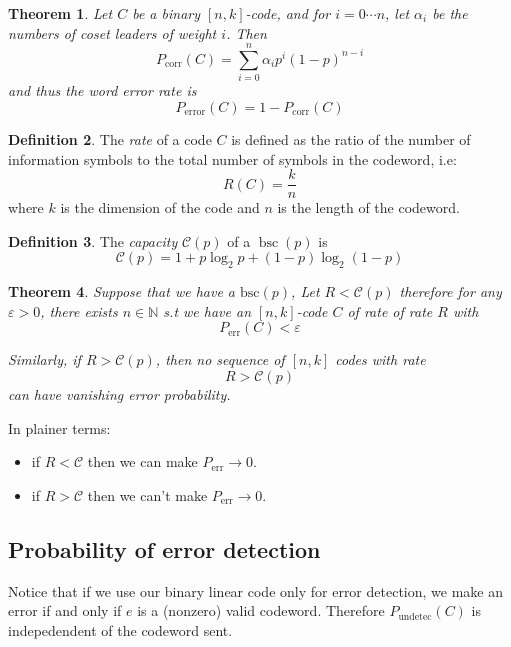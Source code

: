 \documentclass[11pt,a4paper]{article}
\theoremstyle{definition}
\newtheorem{definition}{Definition}[section]
\theoremstyle{plain}
\newtheorem{theorem}[definition]{Theorem}
\theoremstyle{remark}
\begin{document}
\begin{theorem}
    Let $C$ be a binary $[n,k]$-code, and for $i = 0 \cdots n$, let $\alpha_i$ be the numbers 
    of coset leaders of weight $i$. Then 
    $$P_{\text{corr}}(C) = \sum_{i = 0}^{n} \alpha_i p^i (1 - p)^{n-i}$$
    and thus the \emph{word error rate} is 
    $$P_{\text{error}}(C) = 1 - P_{\text{corr}}(C)$$
\end{theorem}

\begin{definition}
    The \emph{rate} of a code $C$ is defined as the ratio of the number of information symbols to the total number of symbols in the codeword, i.e: 
    $$R(C) = \frac{k}{n}$$
    where $k$ is the dimension of the code and $n$ is the length of the codeword.
\end{definition}

\begin{definition}
    The \emph{capacity} $\mathscr{C}(p)$ of a $\operatorname*{bsc}(p)$ is 
    $$\mathscr{C}(p) = 1 + p \log_2 p + (1-p) \log_2 (1-p)$$
\end{definition}

\begin{theorem}\label{thm:Shannon-thms}
    Suppose that we have a $\text{bsc}(p)$, Let $R < \mathscr{C}(p)$
    therefore for any $\varepsilon > 0$, there exists $n \in \mathbb{N}$ s.t we have an 
    $[n,k]$-code $C$ of rate of rate $R$ with 
    $$P_{\text{err}}(C) < \varepsilon$$

    Similarly, if $R > \mathscr{C}(p)$, then no sequence of $[n,k]$ codes with rate 
    $$R > \mathscr{C}(p)$$
    can have vanishing error probability. 
\end{theorem}

In plainer terms: 
\begin{itemize}
    \item if $R < \mathscr{C}$ then we can make $P_{\text{err}} \to 0$. 
    \item if $R > \mathscr{C}$ then we can't make $P_{\text{err}} \to 0$.
\end{itemize}

\subsection{Probability of error detection} 

Notice that if we use our binary linear code only for error detection, we make an error if and only if $e$ is a (nonzero) valid codeword. 
Therefore $P_{\text{undetec}}(C)$ is indepedendent of the codeword sent. 
\end{document}
